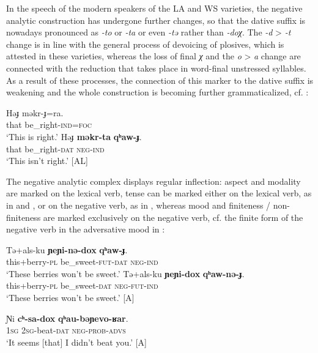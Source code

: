 \documentclass[output=paper,colorlinks,citecolor=brown]{langscibook}
\begin{document}
In the speech of the modern speakers of the LA and WS varieties, the negative analytic construction has undergone further changes, so that the dative suffix is nowadays pronounced as \textit{-to} or \textit{-ta} or even \textit{-tə} rather than \textit{-doχ}. The \textit{-d} > \textit{-t} change is in line with the general process of devoicing of plosives, which is attested in these varieties, whereas the loss of final \textit{χ} and the \textit{o} > \textit{a} change are connected with the reduction that takes place in word-final unstressed syllables. As a result of these processes, the connection of this marker to the dative suffix is weakening and the whole construction is becoming further grammaticalized, cf. :

\ea\label{ex:niv:11}
    \ea\label{ex:niv:11a}
        \gll Həɟ məkr-ɟ=ra. \\ 
             that be\_right-\textsc{ind=foc} \\
        \glt ‘This is right.’
    \ex\label{ex:niv:11b}
        \gll Həɟ \textbf{məkr-ta} \textbf{qʰaw-ɟ}. \\
              that be\_right-\textsc{dat} \textsc{neg-ind}\\
        \glt ‘This isn’t right.’ \citep{Jushkina2019} [AL]
    \z
\z 

The negative analytic complex displays regular inflection: aspect and modality are marked on the lexical verb, tense can be marked either on the lexical verb, as in  and , or on the negative verb, as in , whereas mood and finiteness / non-finiteness are marked exclusively on the negative verb, cf. the finite form of the negative verb in the adversative mood in :

\ea\label{ex:niv:12}
    \ea\label{ex:niv:12a}
        \gll Tə+als-ku \textbf{ɲeɲi-nə-dox} \textbf{qʰaw-ɟ}. \\ 
             this+berry-\textsc{pl} be\_sweet-\textsc{fut-dat} \textsc{neg-ind} \\
        \glt ‘These berries won’t be sweet.’
    \ex\label{ex:niv:12b}
        \gll Tə+als-ku \textbf{ɲeɲi-dox} \textbf{qʰaw-nə{}-ɟ}. \\
             this+berry-\textsc{pl} be\_sweet-\textsc{dat} \textsc{neg-fut-ind} \\
        \glt ‘These berries won’t be sweet.’ [A]
    \z
\z 

\ea\label{ex:niv:13}
    \gll Ɲi \textbf{cʰ-sa-dox} \textbf{qʰau-bəɲevo{}-ʁar}. \\ 
         \textsc{1sg} 2\textsc{sg}{}-beat-\textsc{dat} \textsc{neg}{}-\textsc{prob-advs}\\
    \glt ‘It seems [that] I didn’t beat you.’ \citep[213]{Kreinovich1934} [A]
\z 
\end{document}
